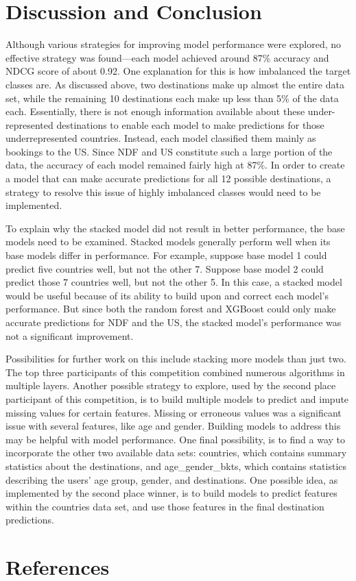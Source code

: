 \documentclass{article}
\begin{document}
\section{Discussion and Conclusion}

Although various strategies for improving model performance were explored, no effective strategy was found---each 
model achieved around 87\% accuracy and NDCG score of about 0.92. One 
explanation for this is how imbalanced the target classes are. As discussed above, two destinations make up
almost the entire data set, while the remaining 10 destinations each make up less than 5\% of the data each. 
Essentially, there is not enough information available about these under-represented destinations to enable each model 
to make predictions for those underrepresented countries. Instead, each model classified them mainly as bookings 
to the US. Since NDF and US constitute such a large portion of the data, the accuracy of each model 
remained fairly high at 87\%. In order to create a model that can make accurate predictions for all 12 possible 
destinations, a strategy to resolve this issue of highly imbalanced classes would need to be implemented.

To explain why the stacked model did not result in better performance, the base models need to be examined. 
Stacked models generally perform well when its base models differ in performance. For example, suppose base model 1
could predict five countries well, but not the other 7. Suppose base model 2 could predict those 7 countries well, 
but not the other 5. In this case, a stacked model would be useful because of its ability to build upon and 
correct each model's performance. But since both the random forest and XGBoost could only make accurate predictions 
for NDF and the US, the stacked model's performance was not a significant improvement. 

Possibilities for further work on this include stacking more models than just two. The top three participants of 
this competition combined numerous algorithms in multiple layers. Another possible strategy
to explore, used by the second place participant of this competition, is to build multiple models to predict 
and impute missing values for certain features. Missing or erroneous values was a significant issue with several 
features, like age and gender. Building models to address this may be helpful with model performance. One final possibility,
is to find a way to incorporate the other two available data sets: countries, which contains summary
statistics about the destinations, and  age\_gender\_bkts, which contains statistics describing the users' age group, 
gender, and destinations. One possible idea, as implemented by the second place winner, is to build models to 
predict features within the countries data set, and use those features in the final destination predictions. 


\section{References}
\end{document}
